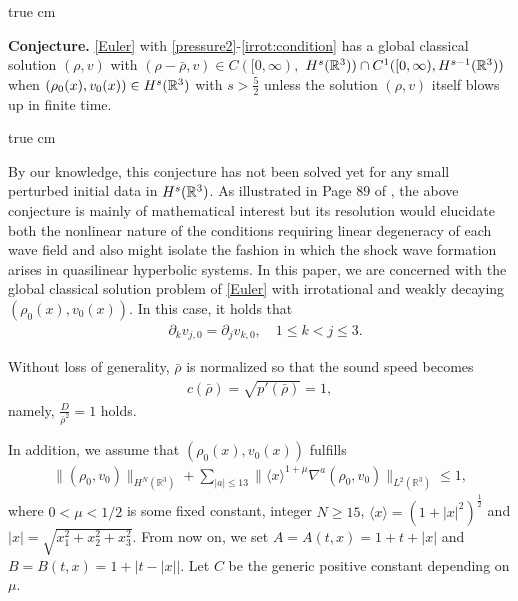 \documentclass[11pt,twoside]{article}
\def\f{\frac}
\def\p{\partial}
\theoremstyle{plain}
\theoremstyle{definition}
\theoremstyle{assumption}
\numberwithin{equation}{section}
\begin{document}
 true cm

{\bf Conjecture.} \eqref{Euler} with \eqref{pressure2}-\eqref{irrot:condition}  has a global classical solution
 $(\rho, v)$ with $(\rho-\bar\rho, v)\in C([0,\infty),$ $H^s(\Bbb R^3))\cap C^1([0,\infty), H^{s-1}(\Bbb R^3))$
 when  $(\rho_0(x), v_0(x))\in H^s(\Bbb R^3)$ with $s>\f52$ unless the solution $(\rho,v)$ itself blows up in finite
time.

 true cm

By our knowledge, this conjecture has not been solved yet for any
small perturbed initial data in $H^s(\Bbb R^3)$. As illustrated in Page 89 of \cite{Majda}, the above conjecture is mainly of
mathematical interest but its resolution would elucidate both the nonlinear nature
of the conditions requiring linear degeneracy of each wave field and also might
isolate the fashion in which the shock wave formation arises in quasilinear hyperbolic
systems. In this paper, we are concerned with the
global classical solution problem of \eqref{Euler} with irrotational and weakly decaying
$(\rho_0(x), v_0(x))$. In this case, it holds that
\begin{equation}\label{irrot:condition-1}
		\begin{split}
		&\p_kv_{j,0}=\p_jv_{k,0},\quad 1\le k<j\le3.
		\end{split}
	\end{equation}
	

Without loss of generality, $\bar\rho$ is
normalized so that the sound speed becomes
\begin{equation}\label{YHC-0}
\begin{split}
c(\bar\rho)=\sqrt{p'(\bar\rho)}=1,
\end{split}
\end{equation}
namely, $\f{D}{{\bar\rho}^2}=1$ holds.

In addition, we assume that
$(\rho_0(x), v_0(x))$ fulfills
\begin{equation}\label{YHC-1}
\begin{split}
\|(\rho_0,v_0)\|_{H^N(\mathbb{R}^3)}
+\sum_{|a|\leq 13}\|\langle x\rangle^{1+\mu}
\nabla^a(\rho_0,v_0)\|_{L^2(\mathbb{R}^3)}
\leq 1,
\end{split}
\end{equation}
where $0<\mu<1/2$ is some fixed constant, integer $N\ge 15$, $\langle x\rangle=(1+|x|^2)^{\f12}$ and $|x|=\sqrt{x_1^2+x_2^2+x_3^2}$.
From now on, we set $A=A(t,x)=1+t+|x|$ and $B=B(t,x)=1+\bigl|t-|x|\bigr|$. Let $C$ be the generic positive constant depending on $\mu$.
\end{document}
